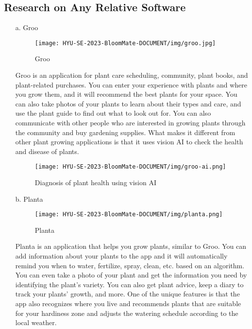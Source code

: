 \documentclass[conference, a4paper]{IEEEtran}
\begin{document}
\subsection{Research on Any Relative Software}
\begin{enumerate}
    \item[a.]Groo
    
\begin{figure}[h]
\texttt{[image: HYU-SE-2023-BloomMate-DOCUMENT/img/groo.jpg]}
\label{fig:Groo}
\caption{Groo} 
\end{figure}

    \item[]Groo is an application for plant care scheduling, community, plant books, and plant-related purchases. You can enter your experience with plants and where you grow them, and it will recommend the best plants for your space. You can also take photos of your plants to learn about their types and care, and use the plant guide to find out what to look out for. You can also communicate with other people who are interested in growing plants through the community and buy gardening supplies. What makes it different from other plant growing applications is that it uses vision AI to check the health and disease of plants.
    
\begin{figure}[h]
\texttt{[image: HYU-SE-2023-BloomMate-DOCUMENT/img/groo-ai.png]}
\label{fig:GrooAI}
\caption{Diagnosis of plant health using vision AI} 
\end{figure}
\newpage

\item[b.]Planta

\begin{figure}[h]
\texttt{[image: HYU-SE-2023-BloomMate-DOCUMENT/img/planta.png]}
\label{fig:Planta}
\caption{Planta} 
\end{figure}

\item[]Planta is an application that helps you grow plants, similar to Groo. You can add information about your plants to the app and it will automatically remind you when to water, fertilize, spray, clean, etc. based on an algorithm. You can even take a photo of your plant and get the information you need by identifying the plant's variety. You can also get plant advice, keep a diary to track your plants' growth, and more. One of the unique features is that the app also recognizes where you live and recommends plants that are suitable for your hardiness zone and adjusts the watering schedule according to the local weather.\\


\end{enumerate}
\end{document}
